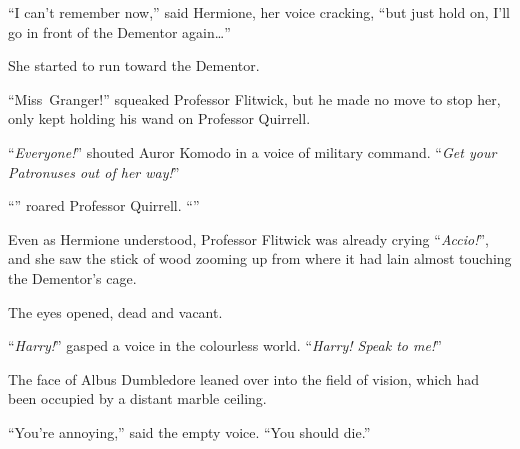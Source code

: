 “I can’t remember now,” said Hermione, her voice cracking, “but just hold on, I’ll go in front of the Dementor again…”

She started to run toward the Dementor.

“Miss~Granger!” squeaked Professor Flitwick, but he made no move to stop her, only kept holding his wand on Professor Quirrell.

“\emph{Everyone!}” shouted Auror Komodo in a voice of military command. “\emph{Get your Patronuses out of her way!}”

“” roared Professor Quirrell. “”

Even as Hermione understood, Professor Flitwick was already crying “\emph{Accio!}”, and she saw the stick of wood zooming up from where it had lain almost touching the Dementor’s cage.

\later

The eyes opened, dead and vacant.

“\emph{Harry!}” gasped a voice in the colourless world. “\emph{Harry! Speak to me!}”

The face of Albus Dumbledore leaned over into the field of vision, which had been occupied by a distant marble ceiling.

“You’re annoying,” said the empty voice. “You should die.”

